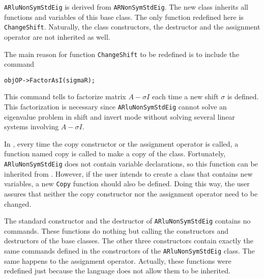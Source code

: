 \texttt{ARluNonSymStdEig} is derived from \texttt{ARNonSymStdEig}. The new class inherits all functions and variables of this base class. The only function redefined here is \texttt{ChangeShift}. Naturally, the class constructors, the destructor and the assignment operator are not inherited as well.

The main reason for function \texttt{ChangeShift} to be redefined is to include the command
\begin{verbatim}
objOP->FactorAsI(sigmaR);
\end{verbatim}
This command tells \ARPP{} to factorize matrix $A-\sigma I$ each time a new shift $\sigma$ is defined. This factorization is necessary since \texttt{ARluNonSymStdEig} cannot solve an eigenvalue problem in shift and invert mode without solving several linear systems involving $A-\sigma I$.

In \ARPP{}, every time the copy constructor or the assignment operator is called, a function named copy is called to make a copy of the class. Fortunately, \texttt{ARluNonSymStdEig} does not contain variable declarations, so this function can be inherited from . However, if the user intends to create a class that contains new variables, a new \texttt{Copy} function should also be defined. Doing this way, the user assures that neither the copy constructor nor the assignment operator need to be changed.

The standard constructor and the destructor of \texttt{ARluNonSymStdEig} contains no commands. These functions do nothing but calling the constructors and destructors of the base classes. The other three constructors contain exactly the same commands defined in the constructors of the \texttt{ARluNonSymStdEig} class. The same happens to the assignment operator. Actually, these functions were redefined just because the language does not allow them to be inherited.
